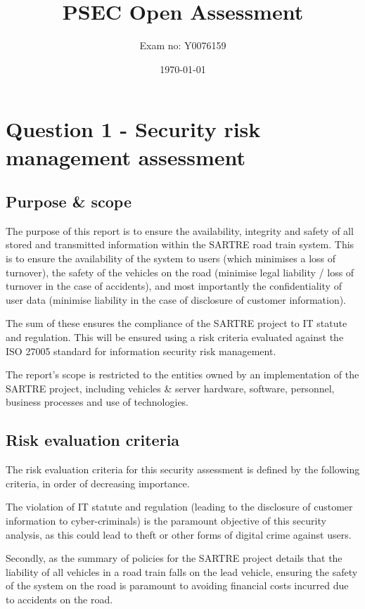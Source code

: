 \documentclass[british,11pt,a4paper]{article}
\begin{document}
\title{PSEC Open Assessment}
\author{Exam no: Y0076159}
\date{\today}
\maketitle
\tableofcontents
\clearpage
\listoffigures
\listoftables
\clearpage

\section{Question 1 - Security risk management assessment}
\subsection{Purpose \& scope}
\label{subsec:purpose_scope}
The purpose of this report is to ensure the availability, integrity and safety of all stored and transmitted information within the SARTRE road train system. This is to ensure the availability of the system to users (which minimises a loss of turnover), the safety of the vehicles on the road (minimise legal liability / loss of turnover in the case of accidents), and most importantly the confidentiality of user data (minimise liability in the case of disclosure of customer information).

The sum of these ensures the compliance of the SARTRE project to IT statute and regulation. This will be ensured using a risk criteria evaluated against the ISO 27005  standard \cite{Iso2005-nn} for information security risk management. 

The report's scope is restricted to the entities owned by an implementation of the SARTRE project, including vehicles \& server hardware, software, personnel, business processes and use of technologies. 

\subsection{Risk evaluation criteria}
The risk evaluation criteria for this security assessment is defined by the following criteria, in order of decreasing importance.

The violation of IT statute and regulation (leading to the disclosure of customer information to cyber-criminals) is the paramount objective of this security analysis, as this could lead to theft or other forms of digital crime against users. 

Secondly, as the summary of policies for the SARTRE project \cite{Davila2013-cy} details that the liability of all vehicles in a road train falls on the lead vehicle, ensuring the safety of the system on the road is paramount to avoiding financial costs incurred due to accidents on the road. 
\end{document}
